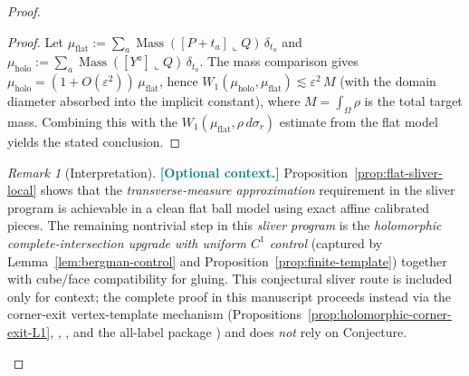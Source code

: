 \documentclass[11pt]{article}
\newcommand{\REVMZ}[1]{\textcolor{teal}{#1}}  %
\numberwithin{equation}{section}  %
\theoremstyle{plain}
\theoremstyle{definition}
\theoremstyle{remark}
\newtheorem{remark}[theorem]{Remark}
\DeclareMathOperator{\Mass}{Mass}
\begin{document}
\begin{proof}
\begin{proof}
Let
\(
\mu_{\mathrm{flat}}:=\sum_a \Mass([P+t_a]\llcorner Q)\,\delta_{t_a}
\)
and
\(
\mu_{\mathrm{holo}}:=\sum_a \Mass([Y^a]\llcorner Q)\,\delta_{t_a}.
\)
The mass comparison gives $\mu_{\mathrm{holo}}=(1+O(\varepsilon^2))\,\mu_{\mathrm{flat}}$, hence
\(
W_1(\mu_{\mathrm{holo}},\mu_{\mathrm{flat}})\lesssim \varepsilon^2\,M
\)
(with the domain diameter absorbed into the implicit constant), where $M=\int_\Omega\rho$ is the total target mass.
Combining this with the $W_1(\mu_{\mathrm{flat}},\rho\,d\sigma_r)$ estimate from the flat model yields the stated conclusion.
\end{proof}





\begin{remark}[Interpretation]
\REVMZ{\textbf{[Optional context.]}}
Proposition~\ref{prop:flat-sliver-local} shows that the \emph{transverse-measure approximation} requirement in the sliver program is achievable
in a clean flat ball model using exact affine calibrated pieces.
The remaining nontrivial step in this \emph{sliver program} is the \emph{holomorphic complete-intersection upgrade with uniform $C^1$ control}
(captured by Lemma~\ref{lem:bergman-control} and Proposition~\ref{prop:finite-template}) together with cube/face compatibility for gluing.
This conjectural sliver route is included only for context; the complete proof in this manuscript proceeds instead via the corner-exit vertex-template mechanism
(Propositions~\ref{prop:holomorphic-corner-exit-L1}, , , and the all-label package )
and does \emph{not} rely on Conjecture.
\end{remark}




\end{proof}
\end{document}
